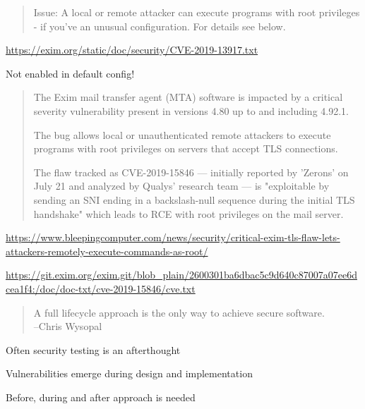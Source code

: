 \documentclass[Screen16to9,17pt]{foils}
\begin{document}
\begin{quote}
Issue:      A local or remote attacker can execute programs with root
            privileges - if you've an unusual configuration. For details
	    see below.
\end{quote}

\url{https://exim.org/static/doc/security/CVE-2019-13917.txt}

Not enabled in default config!


\begin{quote}
The Exim mail transfer agent (MTA) software is impacted by a critical severity vulnerability present in versions 4.80 up to and including 4.92.1.

The bug allows local or unauthenticated remote attackers to execute programs with root privileges on servers that accept TLS connections.

The flaw tracked as CVE-2019-15846 — initially reported by 'Zerons' on July 21 and analyzed by Qualys' research team — is "exploitable by sending an SNI ending in a backslash-null sequence during the initial TLS handshake" which leads to RCE with root privileges on the mail server.
\end{quote}

\url{https://www.bleepingcomputer.com/news/security/critical-exim-tls-flaw-lets-attackers-remotely-execute-commands-as-root/}


\url{https://git.exim.org/exim.git/blob_plain/2600301ba6dbac5c9d640c87007a07ee6dcea1f4:/doc/doc-txt/cve-2019-15846/cve.txt}



\begin{quote}
  A full lifecycle approach is the only way to achieve secure software.\\
  --Chris Wysopal
\end{quote}

\begin{list2}
\item Often security testing is an afterthought
\item Vulnerabilities emerge during design and implementation
\item Before, during and after approach is needed
\end{list2}

\end{document}
